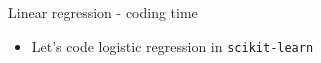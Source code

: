 \documentclass[aspectratio=169]{beamer}
\begin{document}
\begin{frame}{Linear regression - coding time}
    \begin{itemize}
        \item Let's code logistic regression in \texttt{scikit-learn}
    \end{itemize}
\end{frame}

\end{document}
